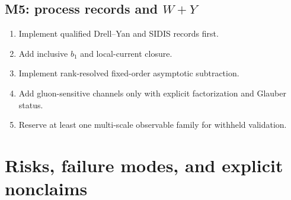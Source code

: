 \documentclass[11pt]{article}
\begin{document}
\subsection{M5: process records and \texorpdfstring{\(W+Y\)}{W+Y}}

\begin{enumerate}
\item Implement qualified Drell--Yan and SIDIS records first.
\item Add inclusive \(b_1\) and local-current closure.
\item Implement rank-resolved fixed-order asymptotic subtraction.
\item Add gluon-sensitive channels only with explicit factorization and
      Glauber status.
\item Reserve at least one multi-scale observable family for withheld
      validation.
\end{enumerate}

\section{Risks, failure modes, and explicit nonclaims}
\label{sec:risks}
\end{document}
